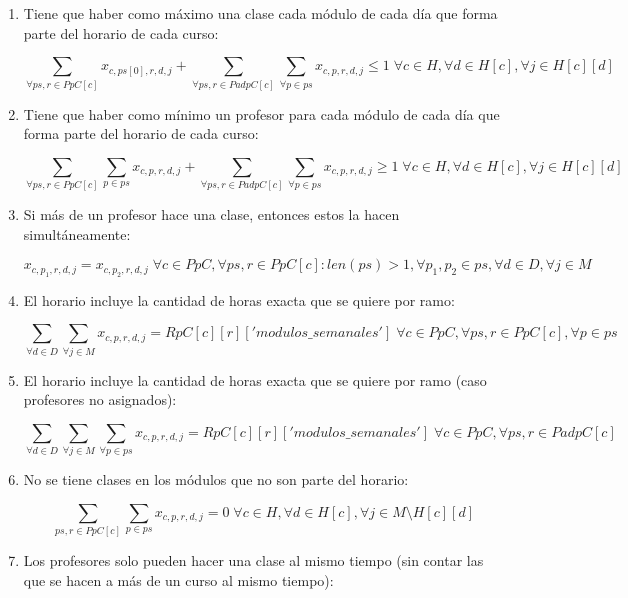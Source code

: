 \documentclass[letterpaper]{article}
\begin{document}
\begin{enumerate}
    \item Tiene que haber como máximo una clase cada módulo de cada día que forma parte del horario de cada curso:

    $$\sum_{\forall ps,r \in PpC[c]} x_{c,ps[0],r,d,j} + \sum_{\forall ps,r \in PadpC[c]} \sum_{\forall p \in ps} x_{c,p,r,d,j} \leq 1 \; \forall c \in H, \forall d \in H[c], \forall j \in H[c][d]$$

    \item Tiene que haber como mínimo un profesor para cada módulo de cada día que forma parte del horario de cada curso:

    $$\sum_{\forall ps,r \in PpC[c]} \sum_{p \in ps} x_{c,p,r,d,j} + \sum_{\forall ps,r \in PadpC[c]} \sum_{\forall p \in ps} x_{c,p,r,d,j} \geq 1 \;  \forall c \in H, \forall d \in H[c], \forall j \in H[c][d]$$

    \item Si más de un profesor hace una clase, entonces estos la hacen simultáneamente:
    
    $$x_{c,p_1,r,d,j} = x_{c,p_2,r,d,j} \; \forall c \in PpC, \forall ps,r \in PpC[c] : len(ps) > 1, \forall p_1,p_2 \in ps, \forall d \in D, \forall j \in M$$

    \item El horario incluye la cantidad de horas exacta que se quiere por ramo:
    
    $$\sum_{\forall d \in D} \sum_{\forall j \in M} x_{c,p,r,d,j} = RpC[c][r]['modulos\_semanales'] \; \forall c \in PpC, \forall ps,r \in PpC[c], \forall p \in ps$$

    \item El horario incluye la cantidad de horas exacta que se quiere por ramo (caso profesores no asignados):
    
    $$\sum_{\forall d \in D} \sum_{\forall j \in M} \sum_{\forall p \in ps} x_{c,p,r,d,j} = RpC[c][r]['modulos\_semanales'] \; \forall c \in PpC, \forall ps,r \in PadpC[c]$$

    \item No se tiene clases en los módulos que no son parte del horario:

    $$\sum_{ps,r \in PpC[c]} \sum_{p \in ps} x_{c,p,r,d,j} = 0 \; \forall c \in H, \forall d \in H[c], \forall j \in M \setminus H[c][d]$$

    \item Los profesores solo pueden hacer una clase al mismo tiempo (sin contar las que se hacen a más de un curso al mismo tiempo):


\end{enumerate}
\end{document}
